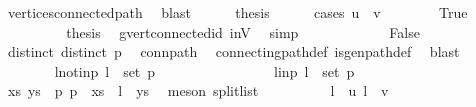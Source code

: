 \begin{isabellebody}
\ vertices{\isacharunderscore}{\kern0pt}connected{\isacharunderscore}{\kern0pt}path\ \isamarkupfalse%
\ blast\isanewline
\ \ \ \ \isamarkupfalse%
\ {\isacharquery}{\kern0pt}thesis\isanewline
\ \ \ \ \isamarkupfalse%
\ {\isacharparenleft}{\kern0pt}cases\ {\isachardoublequoteopen}u\ {\isacharequal}{\kern0pt}\ v{\isachardoublequoteclose}{\isacharparenright}{\kern0pt}\isanewline
\ \ \ \ \ \ \isamarkupfalse%
\ True\isanewline
\ \ \ \ \ \ \isamarkupfalse%
\ \isamarkupfalse%
\ {\isacharquery}{\kern0pt}thesis\ \isamarkupfalse%
\ g{\isacharprime}{\kern0pt}{\isachardot}{\kern0pt}vert{\isacharunderscore}{\kern0pt}connected{\isacharunderscore}{\kern0pt}id\ inV{\isacharprime}{\kern0pt}\ \isamarkupfalse%
\ simp\isanewline
\ \ \ \ \isamarkupfalse%
\isanewline
\ \ \ \ \ \ \isamarkupfalse%
\ False\isanewline
\ \ \ \ \ \ \isamarkupfalse%
\ \isamarkupfalse%
\ distinct{\isacharcolon}{\kern0pt}\ {\isachardoublequoteopen}distinct\ p{\isachardoublequoteclose}\ \isamarkupfalse%
\ conn{\isacharunderscore}{\kern0pt}path\ \isamarkupfalse%
\ connecting{\isacharunderscore}{\kern0pt}path{\isacharunderscore}{\kern0pt}def\ is{\isacharunderscore}{\kern0pt}gen{\isacharunderscore}{\kern0pt}path{\isacharunderscore}{\kern0pt}def\ \isamarkupfalse%
\ blast\isanewline
\ \ \ \ \ \ \isamarkupfalse%
\ l{\isacharunderscore}{\kern0pt}notin{\isacharunderscore}{\kern0pt}p{\isacharcolon}{\kern0pt}\ {\isachardoublequoteopen}l\ {\isasymnotin}\ set\ p{\isachardoublequoteclose}\isanewline
\ \ \ \ \ \ \isamarkupfalse%
\isanewline
\ \ \ \ \ \ \ \ \isamarkupfalse%
\ l{\isacharunderscore}{\kern0pt}in{\isacharunderscore}{\kern0pt}p{\isacharcolon}{\kern0pt}\ {\isachardoublequoteopen}l\ {\isasymin}\ set\ p{\isachardoublequoteclose}\isanewline
\ \ \ \ \ \ \ \ \isamarkupfalse%
\ \isamarkupfalse%
\ xs\ ys\ \ p{\isacharcolon}{\kern0pt}\ {\isachardoublequoteopen}p\ {\isacharequal}{\kern0pt}\ xs\ {\isacharat}{\kern0pt}\ l\ {\isacharhash}{\kern0pt}\ ys{\isachardoublequoteclose}\ \isamarkupfalse%
\ {\isacharparenleft}{\kern0pt}meson\ split{\isacharunderscore}{\kern0pt}list{\isacharparenright}{\kern0pt}\isanewline
\ \ \ \ \ \ \ \ \isamarkupfalse%
\ {\isachardoublequoteopen}l\ {\isasymnoteq}\ u{\isachardoublequoteclose}\ {\isachardoublequoteopen}l\ {\isasymnoteq}\ v{\isachardoublequoteclose}\ \isamarkupfalse%

\end{isabellebody}
